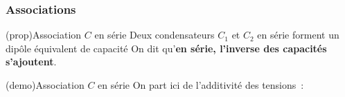 \documentclass[../../main/main.tex]{subfiles}
\begin{document}
\subsubsection{Associations}
\begin{tcb*}[label=prop:cserie, sidebyside](prop){Association $C$ en série}
	Deux condensateurs $C_1$ et $C_2$ en série forment un dipôle équivalent de
	capacité
	\psw{%
		\[
			\boxed{\dfrac{1}{C\ind{eq}} = \dfrac{1}{C_1} + \dfrac{1}{C_2}}
		\]
	}%
	On dit qu'\textbf{en série, l'inverse des capacités s'ajoutent}.
	\tcblower
	\begin{center}
	\end{center}
\end{tcb*}
\begin{tcb*}[label=demo:cserie](demo){Association $C$ en série}
	On part ici de l'additivité des tensions~:
	\vspace{-15pt}
\end{tcb*}
\end{document}
